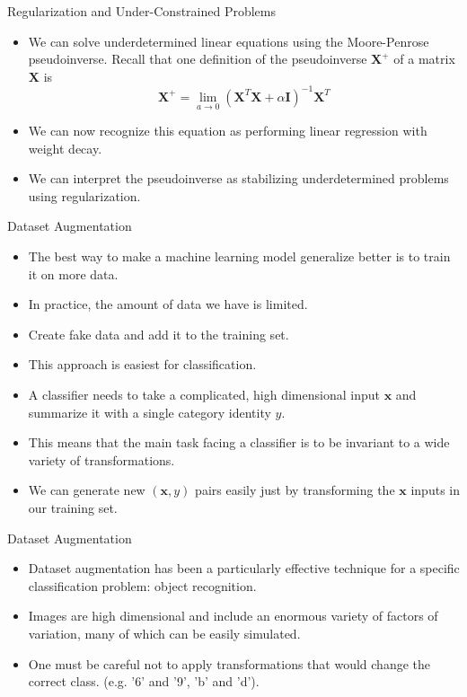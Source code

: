 \documentclass[10pt]{beamer}
\begin{document}
	\begin{frame}{Regularization and Under-Constrained Problems}
		\begin{itemize}
			\item We can solve underdetermined linear equations using the Moore-Penrose pseudoinverse. Recall that one definition of the pseudoinverse $\bm{X}^+$ of a matrix $\bm{X}$ is
			$$\bm{X^+}=\lim_{a\rightarrow0}(\bm{X}^T\bm{X}+\alpha\bm{I})^{-1}\bm{X}^T$$
			
			\pause
			\item We can now recognize this equation as performing linear regression with weight decay.
			\pause
			\item We can interpret the pseudoinverse as stabilizing underdetermined problems using regularization.
		\end{itemize}
	\end{frame}

	\begin{frame}{Dataset Augmentation}
		\begin{itemize}
			\pause
			\item The best way to make a machine learning model generalize better is to train it on more data.
			\pause
			\item In practice, the amount of data we have is limited.
			\pause
			\item Create fake data and add it to the training set.
			\pause
			\item This approach is easiest for classification.
			\pause
			\item A classifier needs to take a complicated, high dimensional input $\bm{x}$ and summarize it with a single category identity $y$.
			\pause
			\item This means that the main task facing a classifier is to be invariant to a wide variety of transformations.
			\pause
			\item We can generate new $(\bm{x},y)$ pairs easily just by transforming the $\bm{x}$ inputs in our training set.
		\end{itemize}
	\end{frame}

	\begin{frame}{Dataset Augmentation}
		\begin{itemize}
			\item Dataset augmentation has been a particularly effective technique for a specific classification problem: object recognition.
			\pause
			\item Images are high dimensional and include an enormous variety of factors of variation, many of which can be easily simulated.
			\pause
			\item One must be careful not to apply transformations that would change the correct class. (e.g. '6' and '9', 'b' and 'd').
		\end{itemize}
	\end{frame}
\end{document}
